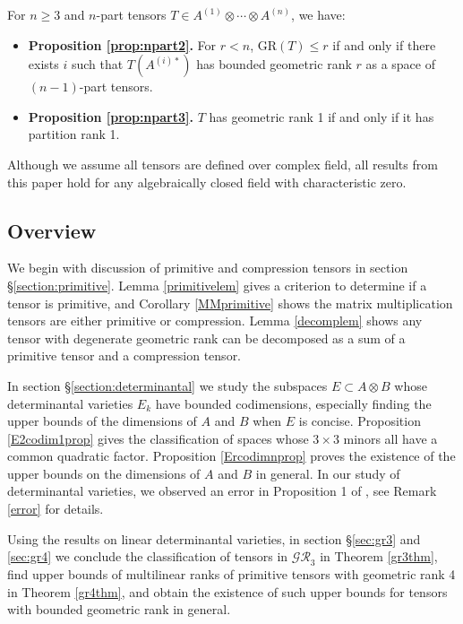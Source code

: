 \documentclass[10pt]{article} %
\newcommand{\ot}{\otimes}
\theoremstyle{definition}
\begin{document}
For $n\geq 3$ and $n$-part tensors $T\in A^{(1)}\otimes\cdots\otimes A^{(n)}$, we have:
\begin{itemize}
    \item \textbf{Proposition \ref{prop:npart2}.} For $r< n$, $\mathrm{GR}(T)\leq r$ if and only if there exists $i$ such that $T(A^{(i)*})$ has bounded geometric rank $r$ as a space of $(n-1)$-part tensors.
    
    \item \textbf{Proposition \ref{prop:npart3}.} $T$ has geometric rank 1 if and only if it has partition rank 1.
\end{itemize}

Although we assume all tensors are defined over complex field, all results from this paper hold for any algebraically closed field with characteristic zero.

\subsection{Overview}
We begin with discussion of primitive and compression tensors in section \S \ref{section:primitive}. Lemma \ref{primitivelem} gives a criterion to determine if a tensor is primitive, and Corollary \ref{MMprimitive} shows the matrix multiplication tensors are either primitive or compression. Lemma \ref{decomplem} shows any tensor with degenerate geometric rank can be decomposed as a sum of a primitive tensor and a compression tensor.

In section \S \ref{section:determinantal} we study the subspaces $E\subset A\ot B$ whose determinantal varieties $E_k$ have bounded codimensions, especially finding the upper bounds of the dimensions of $A$ and $B$ when $E$ is concise. Proposition \ref{E2codim1prop} gives the classification of spaces whose $3\times 3$ minors all have a common quadratic factor. Proposition \ref{Ercodimnprop} proves the existence of the upper bounds on the dimensions of $A$ and $B$ in general. In our study of determinantal varieties, we observed an error in Proposition 1 of \cite{beauville2018introduction}, see Remark \ref{error} for details.

Using the results on linear determinantal varieties, in section \S \ref{sec:gr3} and \ref{sec:gr4} we conclude the classification of tensors in $\mathcal{GR}_3$ in Theorem \ref{gr3thm}, find upper bounds of multilinear ranks of primitive tensors with geometric rank 4 in Theorem \ref{gr4thm}, and obtain the existence of such upper bounds for tensors with bounded geometric rank in general.
\end{document}
